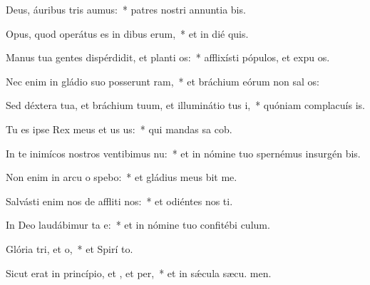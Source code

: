 \item Deus, áuribus tris aumus:~* patres nostri annuntia bis.
\item Opus, quod operátus es in dibus erum,~* et in dié quis.
\item Manus tua gentes dispérdidit, et planti os:~* afflixísti pópulos, et expu os.
\item Nec enim in gládio suo posserunt ram,~* et bráchium eórum non sal os:
\item Sed déxtera tua, et bráchium tuum, et illuminátio tus i,~* quóniam complacuís  is.
\item Tu es ipse Rex meus et us us:~* qui mandas sa cob.
\item In te inimícos nostros ventibimus nu:~* et in nómine tuo spernémus insurgén  bis.
\item Non enim in arcu o spebo:~* et gládius meus  bit me.
\item Salvásti enim nos de affliti nos:~* et odiéntes nos ti.
\item In Deo laudábimur ta e:~* et in nómine tuo confitébi  culum.
\item Glória tri, et o,~* et Spirí to.
\item Sicut erat in princípio, et , et per,~* et in sǽcula sæcu. men.
